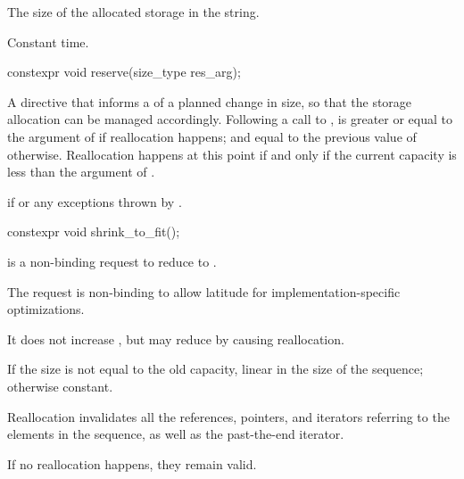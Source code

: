 \begin{itemdescr}
\pnum
\returns
The size of the allocated storage in the string.

\pnum
\complexity
Constant time.
\end{itemdescr}

%
\begin{itemdecl}
constexpr void reserve(size_type res_arg);
\end{itemdecl}

\begin{itemdescr}
\pnum
\effects
A directive that informs a  of a planned change in size,
so that the storage allocation can be managed accordingly.
Following a call to
,
is greater or equal to the argument of
if reallocation happens; and
equal to the previous value of
otherwise.
Reallocation happens at this point if and only if
the current capacity is less than the argument of .

\pnum
\throws
{}
if
 or any exceptions thrown by
 .
\end{itemdescr}

%
\begin{itemdecl}
constexpr void shrink_to_fit();
\end{itemdecl}

\begin{itemdescr}
\pnum
\effects
{} is a non-binding request to reduce
 to .
\begin{note}
The request is non-binding to
allow latitude for implementation-specific optimizations.
\end{note}
It does not increase , but may reduce 
by causing reallocation.

\pnum
\complexity
If the size is not equal to the old capacity,
linear in the size of the sequence;
otherwise constant.

\pnum
\remarks
Reallocation invalidates all the references, pointers, and iterators
referring to the elements in the sequence, as well as the past-the-end iterator.
\begin{note}
If no reallocation happens, they remain valid.
\end{note}
\end{itemdescr}

